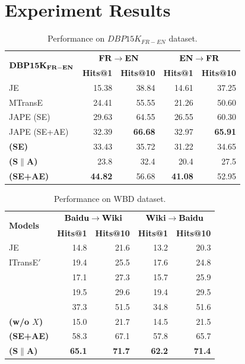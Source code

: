 


\section{Experiment Results\label{sec:results}}


\begin{table}
	\centering
	\scriptsize
	\begin{tabular}{lrrrr}
		\toprule
		\multirow{2}{*}{$\bf DBP15K_{FR-EN}$} & \multicolumn{2}{c|}{$\bf FR \rightarrow EN$} & \multicolumn{2}{c}{$\bf EN \rightarrow FR$} \\
		& \bf Hits@1 & \bf Hits@10 & \bf Hits@1 & \bf Hits@10 \\
		\midrule
		\rowcolor{Gray}JE & 15.38 & 38.84 & 14.61 & 37.25 \\
		MTransE & 24.41 & 55.55 & 21.26 & 50.60 \\
		\rowcolor{Gray}JAPE (SE) & 29.63 & 64.55 & 26.55 & 60.30 \\
		JAPE (SE+AE) & 32.39 & \bf 66.68 & 32.97 & \bf 65.91 \\
		\rowcolor{Gray} \bf \HRGCN (SE) & 33.43& 35.72& 31.22& 34.65 \\
		\bf \HRGCN (S$\|$A) & 23.8 & 32.4 & 20.4 & 27.5 \\
        \rowcolor{Gray} 	\bf \HRGCN (SE+AE) & \bf 44.82 & 56.68 &\bf 41.08 & 52.95 \\
		\bottomrule
	\end{tabular}
	\caption{Performance on $DBP15K_{FR-EN}$ dataset.}
	\label{cross}
\end{table}

\begin{table}
	\centering
	\scriptsize
	\begin{tabular}{lrrrr}
		\toprule
		\multirow{2}{*}{\bf Models} &  \multicolumn{2}{c|}{$\bf Baidu \rightarrow Wiki$} & \multicolumn{2}{c}{$\bf Wiki \rightarrow Baidu$} \\
		& \bf Hits@1 & \bf Hits@10 & \bf Hits@1 & \bf Hits@10 \\
		\midrule
		\rowcolor{Gray} JE & 14.8 & 21.6 & 13.2 & 20.3 \\
		ITransE$'$ & 19.4 & 25.5 & 17.6 & 24.8 \\
		\rowcolor{Gray} \GCN & 17.1 & 27.3 & 15.7 & 25.9 \\
		\HGCN & 19.5 & 29.6 & 19.4 & 29.5  \\
		\rowcolor{Gray} \RGCN & 37.3 & 51.5 & 34.8 & 51.6 \\
		\bf \HRGCN (w/o $X$) & 15.0 & 21.7 & 14.5 & 21.5 \\
		\rowcolor{Gray} \bf \HRGCN (SE+AE) & 58.3 & 67.1 & 57.8{\tiny } & 65.7 \\
		\bf \HRGCN (S$\|$A) & \bf 65.1 & \bf 71.7 & \bf 62.2 & \bf 71.4\\
		\bottomrule
	\end{tabular}
	\caption{Performance on WBD dataset.}
	\label{f1}
\end{table}
